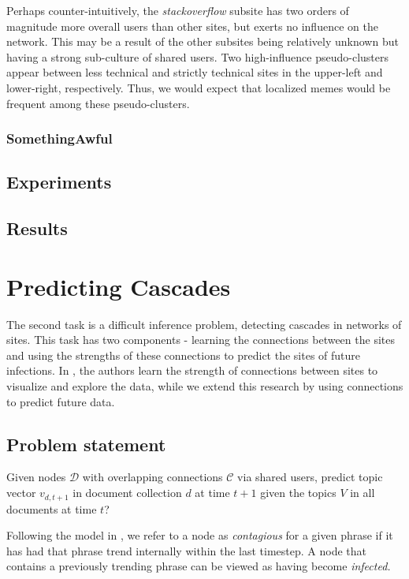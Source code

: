 \documentclass{article} %
\begin{document}
Perhaps counter-intuitively, the \textit{stackoverflow} subsite has two orders of magnitude more overall users than other sites, but exerts no influence on the network. This may be a result of the other subsites being relatively unknown but having a strong sub-culture of shared users. Two high-influence pseudo-clusters appear between less technical and strictly technical sites in the upper-left and lower-right, respectively. Thus, we would expect that localized memes would be frequent among these pseudo-clusters.

\subsubsection{SomethingAwful}

\subsection{Experiments}
\label{experiments}

\subsection{Results}
\label{results}

\section{Predicting Cascades}

The second task is a difficult inference problem, detecting cascades in networks of sites. This task has two components - learning the connections between the sites and using the strengths of these connections to predict the sites of future infections. In \cite{netinf}, the authors learn the strength of connections between sites to visualize and explore the data, while we extend this research by using connections to predict future data.


\subsection{Problem statement}
Given nodes $\mathcal{D}$ with overlapping connections $\mathcal{C}$ via shared users, predict topic vector $v_{d,t+1}$ in document collection $d$ at time $t+1$ given the topics $V$ in all documents at time $t$?


Following the model in \cite{influential}, we refer to a node as \textit{contagious} for a given phrase if it has had that phrase trend internally within the last timestep. A node that contains a previously trending phrase can be viewed as having become \textit{infected.} 
\end{document}
